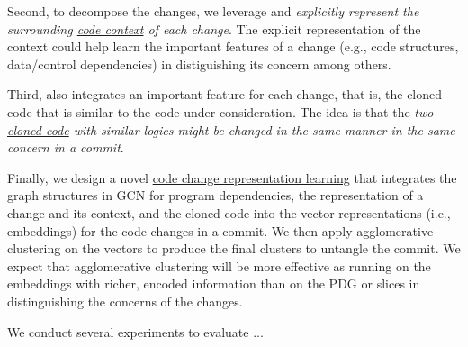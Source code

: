 Second, to decompose the changes, we leverage and {\em
  explicitly represent the surrounding \underline{code context} of
  each change}. The explicit representation of the context could help
{\tool} learn the important features of a change (e.g., code
structures, data/control dependencies) in distiguishing its concern
among others.

Third, {\tool} also integrates an important feature for
each change, that is, the cloned code that is similar to the code
under consideration. The idea is that the {\em two \underline{cloned code} with
  similar logics might be changed in the same manner in the same
  concern in a commit}.

Finally, we design a novel \underline{code change representation learning}
that integrates the graph structures in GCN for program dependencies,
the representation of a change and its context, and the cloned code
into the vector representations (i.e., embeddings) for the code
changes in a commit. We then apply agglomerative clustering on the
vectors to produce the final clusters to untangle the commit. We
expect that agglomerative clustering will be more effective as running
on the embeddings with richer, encoded information than on the PDG or
slices in distinguishing the concerns of the changes.

We conduct several experiments to evaluate {\tool}...


